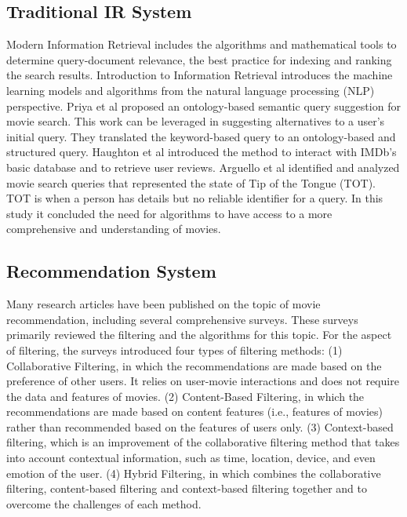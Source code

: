 \documentclass[journal]{IEEEtran}
\theoremstyle{mydefstyle}
\begin{document}
\subsection{Traditional IR System}
Modern Information Retrieval\cite{RN15} includes the algorithms and mathematical tools to determine query-document relevance, the best practice for indexing and ranking the search results. Introduction to Information Retrieval\cite{manning2008introduction} introduces the machine learning models and algorithms from the natural language processing (NLP) perspective. Priya et al\cite{6508326} proposed an ontology-based semantic query suggestion for movie search. This work can be leveraged in suggesting alternatives to a user’s initial query. They translated the keyword-based query to an ontology-based and structured query. Haughton et al\cite{RN16} introduced the method to interact with IMDb’s basic database and to retrieve user reviews. Arguello et al \cite{10.1145/3406522.3446021} identified and analyzed movie search queries that represented the state of Tip of the Tongue (TOT). TOT is when a person has details but no reliable identifier for a query. In this study it concluded the need for algorithms to have access to a more comprehensive and understanding of movies. 

\subsection{Recommendation System}
Many research articles have been published on the topic of movie recommendation, including several comprehensive surveys\cite{RN19}. These surveys primarily reviewed the filtering and the algorithms for this topic. For the aspect of filtering, the surveys introduced four types of filtering methods: (1) Collaborative Filtering, in which the recommendations are made based on the preference of other users. It relies on user-movie interactions and does not require the data and features of movies. (2) Content-Based Filtering, in which the recommendations are made based on content features (i.e., features of movies) rather than recommended based on the features of users only. (3) Context-based filtering, which is an improvement of the collaborative filtering method that takes into account contextual information, such as time, location, device, and even emotion of the user. (4) Hybrid Filtering, in which combines the collaborative filtering, content-based filtering and context-based filtering together and to overcome the challenges of each method.
\end{document}
